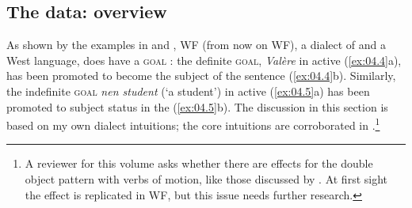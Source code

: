 \documentclass[output=paper]{langsci/langscibook}
\begin{document}
\subsection{The data: overview}\label{sec:04.2.1} %

As shown by the examples in  and ,
\glsdesc{WF} (from now on \gls{WF}), a dialect of 
and a West  language, does have a \textsc{goal} : the
definite \textsc{goal}, \emph{Valère} in active (\ref{ex:04.4}a), has been
promoted to become the subject of the  sentence (\ref{ex:04.4}b).
Similarly, the indefinite \textsc{goal} \emph{nen student} (‘a student’) in
active (\ref{ex:04.5}a) has been promoted to subject status in the 
(\ref{ex:04.5}b). The discussion in this section is based on my own dialect
intuitions; the core intuitions are corroborated in
\citet{Dhaenens2014}.\footnote{A reviewer for this volume asks whether there
    are  effects for the double object pattern with verbs of motion,
like those discussed by \citet{Haddican2010}. At first sight the effect is
replicated in \gls{WF}, but this issue needs further research.}
\end{document}

